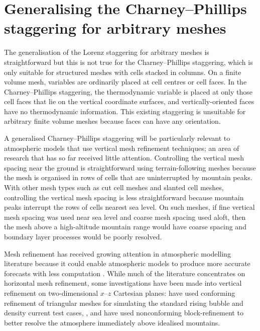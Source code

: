 \section{Generalising the Charney–Phillips staggering for arbitrary meshes}
\label{sec:cp:method}

The generalisation of the Lorenz staggering for arbitrary meshes is straightforward \citep{weller-shahrokhi2014} but this is not true for the Charney--Phillips staggering, which is only suitable for structured meshes with cells stacked in columns.
On a finite volume mesh, variables are ordinarily placed at cell centres or cell faces.
In the Charney--Phillips staggering, the thermodynamic variable is placed at only those cell faces that lie on the vertical coordinate surfaces, and vertically-oriented faces have no thermodynamic information.
This existing staggering is unsuitable for arbitrary finite volume meshes because faces can have any orientation.

A generalised Charney--Phillips staggering will be particularly relevant to atmospheric models that use vertical mesh refinement techniques; an area of research that has so far received little attention.
Controlling the vertical mesh spacing near the ground is straightforward using terrain-following meshes because the mesh is organised in rows of cells that are uninterrupted by mountain peaks.
With other mesh types such as cut cell meshes and slanted cell meshes, controlling the vertical mesh spacing is less straightforward because mountain peaks interrupt the rows of cells nearest sea level.
On such meshes, if fine vertical mesh spacing was used near sea level and coarse mesh spacing used aloft, then the mesh above a high-altitude mountain range would have coarse spacing and boundary layer processes would be poorly resolved.

Mesh refinement has received growing attention in atmospheric modelling literature because it could enable atmospheric models to produce more accurate forecasts with less computation \citep{behrens2006,jablonowski2009}.
While much of the literature concentrates on horizontal mesh refinement, some investigations have been made into vertical refinement on two-dimensional $x$--$z$ Cartesian planes:
\citet{mueller2013} have used conforming refinement of triangular meshes for simulating the standard rising bubble and density current test cases, , and \citet{yamazaki-satomura2012} have used nonconforming block-refinement to better resolve the atmosphere immediately above idealised mountains.

